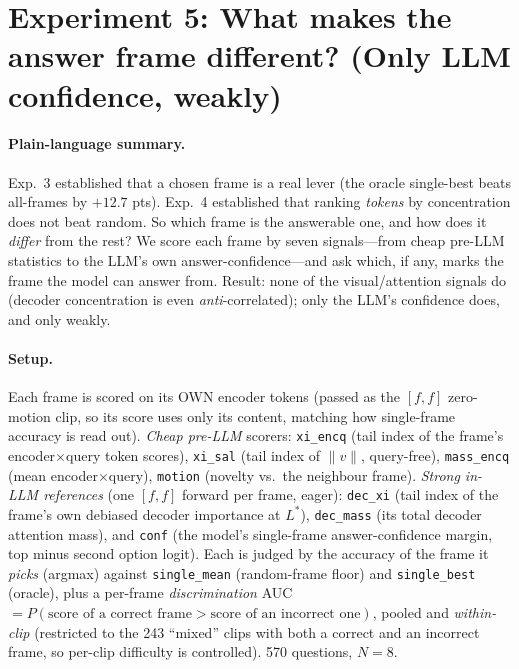 \documentclass[11pt]{article}
\begin{document}
\section{Experiment 5: What makes the answer frame different? (Only LLM confidence, weakly)}

\paragraph{Plain-language summary.}
Exp.~3 established that a chosen frame is a real lever (the oracle single-best beats
all-frames by $+12.7$ pts). Exp.~4 established that ranking \emph{tokens} by concentration
does not beat random. So which frame is the answerable one, and how does it \emph{differ}
from the rest? We score each frame by seven signals---from cheap pre-LLM statistics to the
LLM's own answer-confidence---and ask which, if any, marks the frame the model can answer
from. Result: none of the visual/attention signals do (decoder concentration is even
\emph{anti}-correlated); only the LLM's confidence does, and only weakly.

\paragraph{Setup.} Each frame is scored on its OWN encoder tokens (passed as the $[f,f]$
zero-motion clip, so its score uses only its content, matching how single-frame accuracy
is read out). \emph{Cheap pre-LLM} scorers: \texttt{xi\_encq} (tail index of the frame's
encoder$\times$query token scores), \texttt{xi\_sal} (tail index of $\lVert v\rVert$,
query-free), \texttt{mass\_encq} (mean encoder$\times$query), \texttt{motion} (novelty vs.\
the neighbour frame). \emph{Strong in-LLM references} (one $[f,f]$ forward per frame, eager):
\texttt{dec\_xi} (tail index of the frame's own debiased decoder importance at $L^{\!*}$),
\texttt{dec\_mass} (its total decoder attention mass), and \texttt{conf} (the model's
single-frame answer-confidence margin, top minus second option logit). Each is judged by
the accuracy of the frame it \emph{picks} (argmax) against \texttt{single\_mean}
(random-frame floor) and \texttt{single\_best} (oracle), plus a per-frame \emph{discrimination}
AUC $=P(\text{score of a correct frame}>\text{score of an incorrect one})$, pooled and
\emph{within-clip} (restricted to the 243 ``mixed'' clips with both a correct and an
incorrect frame, so per-clip difficulty is controlled). 570 questions, $N{=}8$.
\end{document}

